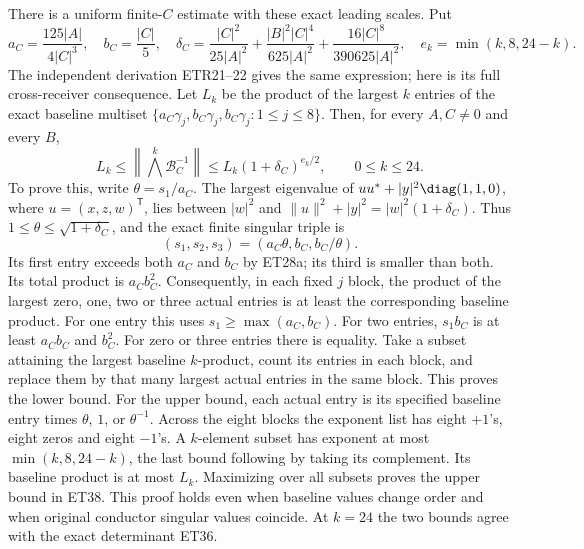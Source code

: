 There is a uniform finite-$C$ estimate with these exact leading scales.
Put
\[
 a_C=\frac{125|A|}{4|C|^3},\quad b_C=\frac{|C|}{5},\quad
 \delta_C=\frac{|C|^2}{25|A|^2}
       +\frac{|B|^2|C|^4}{625|A|^2}
       +\frac{16|C|^8}{390625|A|^2},\quad
 e_k=\min(k,8,24-k).
 \tag{ET37}
\]
The independent derivation ETR21--22 gives the same expression;
here is its full cross-receiver consequence.
Let $L_k$ be the product of the largest $k$ entries of the exact
baseline multiset
$\{a_C\gamma_j,b_C\gamma_j,b_C\gamma_j:1\le j\le8\}$.
Then, for every $A,C\ne0$ and every $B$,
\[
 L_k\le\left\|\bigwedge^k\mathcal B_C^{-1}\right\|
          \le L_k(1+\delta_C)^{e_k/2},
 \qquad 0\le k\le24 .
 \tag{ET38}
\]
To prove this, write $\theta=s_1/a_C$.
The largest eigenvalue of $uu^*+|y|^2\diag(1,1,0)$, where
$u=(x,z,w)^{\mathsf T}$, lies between $|w|^2$ and
$\|u\|^2+|y|^2=|w|^2(1+\delta_C)$.
Thus $1\le\theta\le\sqrt{1+\delta_C}$, and the exact finite
singular triple is
\[
 (s_1,s_2,s_3)=(a_C\theta,b_C,b_C/\theta).
 \tag{ET39}
\]
Its first entry exceeds both $a_C$ and $b_C$ by ET28a; its third
is smaller than both. Its total product is $a_Cb_C^2$.
Consequently, in each fixed $j$ block, the product of the largest
zero, one, two or three actual entries is at least the corresponding
baseline product. For one entry this uses $s_1\ge\max(a_C,b_C)$.
For two entries, $s_1b_C$ is at least $a_Cb_C$ and $b_C^2$.
For zero or three entries there is equality.
Take a subset attaining the largest baseline $k$-product, count its
entries in each block, and replace them by that many largest actual
entries in the same block. This proves the lower bound.
For the upper bound, each actual entry is its specified baseline
entry times $\theta$, $1$, or $\theta^{-1}$.
Across the eight blocks the exponent list has eight $+1$'s,
eight zeros and eight $-1$'s. A $k$-element subset has exponent
at most $\min(k,8,24-k)$, the last bound following by taking its
complement. Its baseline product is at most $L_k$.
Maximizing over all subsets proves the upper bound in ET38.
This proof holds even when baseline values change order and when
original conductor singular values coincide. At $k=24$ the two
bounds agree with the exact determinant ET36.
